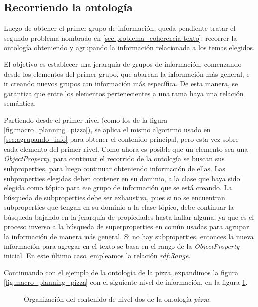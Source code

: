 \subsection{Recorriendo la ontología}
Luego de obtener el primer grupo de información, queda pendiente tratar el segundo problema nombrado en \ref{sec:problema_coherencia-texto}: recorrer la ontología obteniendo y agrupando la información relacionada a los temas elegidos. 

El objetivo es establecer una jerarquía de grupos de información, comenzando desde los elementos del primer grupo, que abarcan la información más general, e ir creando nuevos grupos con información más específica. De esta manera, se garantiza que entre los elementos pertenecientes a una rama haya una relación semántica.

Partiendo desde el primer nivel (como los de la figura \ref{fig:macro_planning_pizza}), se aplica el mismo algoritmo usado en \ref{sec:agrupando_info} para obtener el contenido principal, pero esta vez sobre cada elemento del primer nivel. Como ahora es posible que un elemento sea una \emph{ObjectProperty}, para continuar el recorrido de la ontología se buscan sus subproperties, para luego continuar obteniendo información de ellas. Las subproperties elegidas deben contener en su dominio, a la clase que haya sido elegida como tópico para ese grupo de información que se está creando. La búsqueda de subproperties debe ser exhaustiva, pues si no se encuentran subproperties que tengan en su dominio a la clase tópico, debe continuar la búsqueda bajando en la jerarquía de propiedades hasta hallar alguna, ya que es el proceso inverso a la búsqueda de superproperties en común usadas para agrupar la información de manera más general. Si no hay subproperties, entonces la nueva información para agregar en el texto se basa en el rango de la \emph{ObjectProperty} inicial. En este último caso, empleamos la relación \emph{rdf:Range}.

Continuando con el ejemplo de la ontología de la pizza, expandimos la figura \ref{fig:macro_planning_pizza} con el siguiente nivel de información, en la figura \ref{fig:macro_planning_pizza_n2}. 
\begin{figure}[H]
\caption{Organización del contenido de nivel dos de la ontología \emph{pizza}.}
\label{fig:macro_planning_pizza_n2}
\end{figure}

